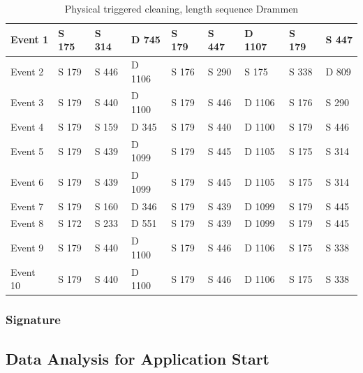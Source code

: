 \begin{table}[H]
\centering
\caption{Physical triggered cleaning, length sequence Drammen}
\label{tab:PCSequenceDrammen}
\begin{tabular}{|l|l|l|l|l|l|l|l|l|}
\hline
Event 1  & S 175 & S 314 & D 745  & S 179 & S 447 & D 1107 & S 179 & S 447 \\ \hline
Event 2  & S 179 & S 446 & D 1106 & S 176 & S 290 & S 175  & S 338 & D 809 \\ \hline
Event 3  & S 179 & S 440 & D 1100 & S 179 & S 446 & D 1106 & S 176 & S 290 \\ \hline
Event 4  & S 179 & S 159 & D 345  & S 179 & S 440 & D 1100 & S 179 & S 446 \\ \hline
Event 5  & S 179 & S 439 & D 1099 & S 179 & S 445 & D 1105 & S 175 & S 314 \\ \hline
Event 6  & S 179 & S 439 & D 1099 & S 179 & S 445 & D 1105 & S 175 & S 314 \\ \hline
Event 7  & S 179 & S 160 & D 346  & S 179 & S 439 & D 1099 & S 179 & S 445 \\ \hline
Event 8  & S 172 & S 233 & D 551  & S 179 & S 439 & D 1099 & S 179 & S 445 \\ \hline
Event 9  & S 179 & S 440 & D 1100 & S 179 & S 446 & D 1106 & S 175 & S 338 \\ \hline
Event 10 & S 179 & S 440 & D 1100 & S 179 & S 446 & D 1106 & S 175 & S 338 \\ \hline
\end{tabular}
\end{table}

\subsubsection{Signature}


\subsection{Data Analysis for Application Start}

